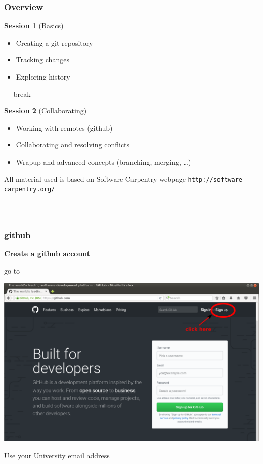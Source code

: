 \documentclass{beamer}
\begin{document}
\begin{frame}
  \frametitle{Overview}
  \textbf{\Large Session 1} (Basics) {\color{red}{14:15h - 15:15h}}
  \begin{itemize}
  \item Creating a git repository
  \item Tracking changes
  \item Exploring history
  \end{itemize}
  \vspace{-1ex}
  \begin{center}
  --- break ---
  \end{center}
  \vspace{-1ex}
  \textbf{\Large Session 2} (Collaborating) {\color{red}{15:45h - 17:05h}}
  \begin{itemize}
  \item Working with remotes (github)
  \item Collaborating and resolving conflicts
  \item Wrapup and advanced concepts (branching, merging, \dots)
  \end{itemize}
  \vspace{1ex}
  All material used is based on Software Carpentry webpage \texttt{http://software-carpentry.org/}
\end{frame}


\begin{frame}
  \frametitle{${}^{}$}
\end{frame}


\begin{frame}
  \frametitle{github}
  \textbf{Create a github account}
  \begin{center}
    go to {}
  \end{center}
  \begin{center}
    \includegraphics[width=0.75\linewidth]{github.pdf}
  \end{center}
  Use your \underline{University email address}
\end{frame}
\end{document}
